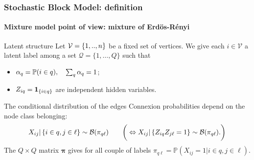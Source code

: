 \documentclass{beamer}\usepackage[]{graphicx}\usepackage[]{color}
\begin{document}
\begin{frame}
  \frametitle{Stochastic Block Model: definition}
    \framesubtitle{Mixture model point of view: mixture of Erdös-Rényi}

    \begin{block}{Latent structure}
      Let $\mathcal{V} = \left\{1,..,n\right\}$ be a fixed set of vertices. We give each $i\in\mathcal{V}$ a \alert{latent label} among a set $\mathcal{Q}=\{1,\dots,Q\}$ such that
    \begin{itemize}
    \item $\alpha_q = \mathbb{P}(i\in q), \quad \sum_q \alpha_q=1$;
    \item $Z_{iq}=\mathbf{1}_{\{i \in  q\}}$  are independent  hidden variables.
   \end{itemize}
   \end{block}

    \begin{block}{The conditional distribution of the edges}
    Connexion probabilities depend on the node class belonging:
    \begin{equation*}
      X_{ij} | \left\{i\in q, j\in\ell\right\} \sim \mathcal{B}(\pi_{q \ell}) \qquad \bigg(\Leftrightarrow       X_{ij} | \left\{Z_{iq}Z_{j\ell}=1\right\} \sim \mathcal{B}(\pi_{q \ell}).
 \bigg)
    \end{equation*}
    The $Q\times Q$ matrix ${\boldsymbol\pi}$  gives for all couple of labels $\pi_{q\ell}=\mathbb{P}(X_{ij}=1|i\in q, j\in\ell)$.
   \end{block}

\end{frame}
\end{document}
